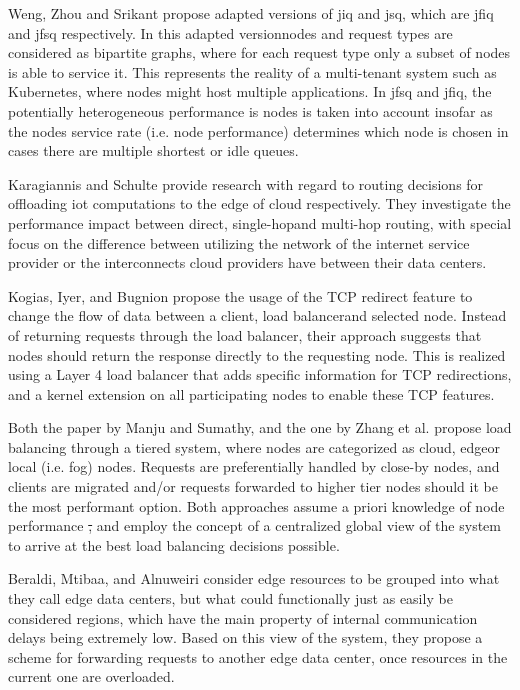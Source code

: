\documentclass[draft,final]{vutinfth} %
\providecommand{\DIFaddtex}[1]{{\protect\color{blue}\uwave{#1}}} %
\providecommand{\DIFdeltex}[1]{{\protect\color{red}\sout{#1}}}                      %
\providecommand{\DIFaddbegin}{} %
\providecommand{\DIFaddend}{} %
\providecommand{\DIFdelbegin}{} %
\providecommand{\DIFdelend}{} %
\providecommand{\DIFadd}[1]{\texorpdfstring{\DIFaddtex{#1}}{#1}} %
\providecommand{\DIFdel}[1]{\texorpdfstring{\DIFdeltex{#1}}{}} %
\begin{document}
Weng, Zhou and Srikant propose adapted versions of \gls{jiq} and \gls{jsq}, which are \gls{jfiq} and \gls{jfsq} respectively.
In this adapted version\DIFaddbegin \DIFadd{, }\DIFaddend nodes and request types are considered as bipartite graphs, where for each request type only a subset of nodes is able to service it.
This represents the reality of a multi-tenant system such as Kubernetes\cite{kubernetes}, where nodes might host multiple applications.
In \gls{jfsq} and \gls{jfiq}, the potentially heterogeneous performance is nodes is taken into account insofar as the nodes service rate (i.e. node performance) determines which node is chosen in cases there are multiple shortest or idle queues.


Karagiannis and Schulte provide research with regard to routing decisions for offloading \gls{iot} computations to the edge of cloud respectively\cite{karagiannisEdgeRoutingUsingCompute2021}.
They investigate the performance impact between direct, single-hop\DIFaddbegin \DIFadd{, }\DIFaddend and multi-hop routing, with special focus on the difference between utilizing the network of the internet service provider or the interconnects cloud providers have between their data centers.

Kogias, Iyer, and Bugnion propose the usage of the TCP redirect feature to change the flow of data between a client, load balancer\DIFaddbegin \DIFadd{, }\DIFaddend and selected node\cite{kogiasBypassingLoadBalancer2020}.
Instead of returning requests through the load balancer, their approach suggests that nodes should return the response directly to the requesting node.
This is realized using a Layer 4 load balancer that adds specific information for TCP redirections, and a kernel extension on all participating nodes to enable these TCP features.

Both the paper by Manju and Sumathy\cite{manjuEfficientLoadBalancing2019}, and the one by Zhang et al. \cite{zhangSecureOptimizedLoad2021} propose load balancing through a tiered system, where nodes are categorized as cloud, edge\DIFaddbegin \DIFadd{, }\DIFaddend or local (i.e. fog) nodes.
Requests are preferentially handled by close-by nodes, and clients are migrated and/or requests forwarded to higher tier nodes should it be the most performant option.
Both approaches assume a priori knowledge of node performance \DIFdelbegin \DIFdel{, }\DIFdelend and employ the concept of a centralized global view of the system to arrive at the best load balancing decisions possible.

Beraldi, Mtibaa, and Alnuweiri\cite{beraldiCooperativeLoadBalancing2017} consider edge resources to be grouped into what they call edge data centers, but what could functionally just as easily be considered regions, which have the main property of internal communication delays being extremely low.
Based on this view of the system, they propose a scheme for forwarding requests to another edge data center, once resources in the current one are overloaded.
\end{document}
